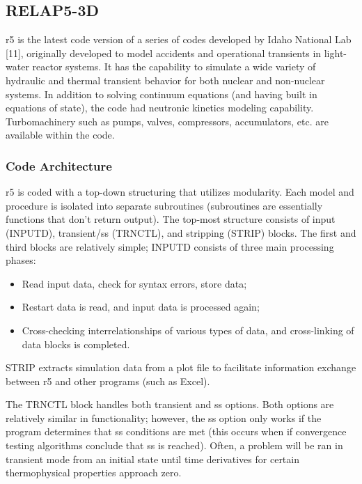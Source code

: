 \documentclass[double,12pt]{beavtex}
\begin{document}
\subsection{RELAP5-3D}

\acrshort{r5} is the latest code version of a series of codes developed by Idaho National Lab [11], originally developed to model accidents and operational transients in light-water reactor systems. It has the capability to simulate a wide variety of hydraulic and thermal transient behavior for both nuclear and non-nuclear systems. In addition to solving continuum equations (and having built in equations of state), the code had neutronic kinetics modeling capability. Turbomachinery such as pumps, valves, compressors, accumulators, etc. are available within the code.  

\subsubsection{Code Architecture}

\acrshort{r5} is coded with a top-down structuring that utilizes modularity. Each model and procedure is isolated into separate subroutines (subroutines are essentially functions that don’t return output). The top-most structure consists of input (INPUTD), transient/\acrshort{ss} (TRNCTL), and stripping (STRIP) blocks. The first and third blocks are relatively simple; INPUTD consists of three main processing phases:

\begin{itemize}
    \item Read input data, check for syntax errors, store data;
    \item Restart data is read, and input data is processed again;
    \item Cross-checking interrelationships of various types of data, and cross-linking of data blocks is completed.
\end{itemize}

STRIP extracts simulation data from a plot file to facilitate information exchange between \acrshort{r5} and other programs (such as Excel). 

The TRNCTL block handles both transient and \acrshort{ss} options. Both options are relatively similar in functionality; however, the \acrshort{ss} option only works if the program determines that \acrshort{ss} conditions are met (this occurs when if convergence testing algorithms conclude that \acrshort{ss} is reached). Often, a problem will be ran in transient mode from an initial state until time derivatives for certain thermophysical properties approach zero. 
\end{document}

